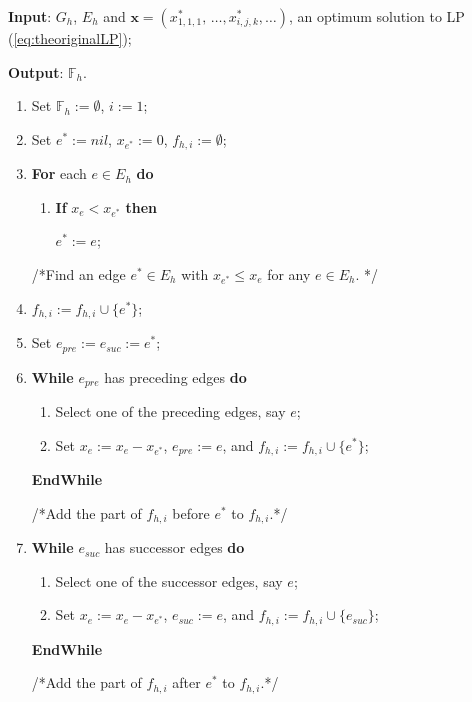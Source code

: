 \documentclass[11pt,english,onecolumn,draftcls]{IEEEtran}
\theoremstyle{plain}
\theoremstyle{plain}
\theoremstyle{plain}
\theoremstyle{plain}
\begin{document}
\begin{algorithm}
\textbf{Input}: $G_{h}$, $E_{h}$ and $\mathbf{x}=(x_{1,1,1}^{*},\,\dots,x_{i,j,k}^{*},\dots)$,
an optimum solution to LP (\ref{eq:theoriginalLP});

\textbf{Output}: $\mathbb{F}_{h}$.
\begin{enumerate}
\item Set $\mathbb{F}_{h}:=\emptyset$, $i:=1$;
\item Set $e^{*}:=nil$, $x{}_{e^{*}}:=0$, $f_{h,i}:=\emptyset$;
\item \textbf{For }each $e\in E_{h}$ \textbf{do}

\begin{enumerate}
\item \textbf{If} $x_{e}<x_{e^{*}}$ \textbf{then}


$e^{*}:=e$;

\end{enumerate}

/{*}Find an edge $e^{*}\in E_{h}$ with $x_{e^{*}}\leq x_{e}$ for
any $e\in E_{h}$. {*}/

\item $f_{h,i}:=f_{h,i}\cup\{e^{*}\}$;
\item Set $e_{pre}:=e_{suc}:=e^{*}$;
\item \textbf{While} $e_{pre}$ has preceding edges \textbf{do}

\begin{enumerate}
\item Select one of the preceding edges, say $e$;
\item Set $x_{e}:=x_{e}-x_{e^{*}}$, $e_{pre}:=e$, and $f_{h,i}:=f_{h,i}\cup\{e^{*}\}$;
\end{enumerate}

\textbf{EndWhile}


/{*}Add the part of $f_{h,i}$ before $e^{*}$ to $f_{h,i}$.{*}/

\item \textbf{While} $e_{suc}$ has successor edges \textbf{do}

\begin{enumerate}
\item Select one of the successor edges, say $e$;
\item Set $x_{e}:=x_{e}-x_{e^{*}}$, $e_{suc}:=e$, and $f_{h,i}:=f_{h,i}\cup\{e_{suc}\}$;
\end{enumerate}

\textbf{EndWhile}


/{*}Add the part of $f_{h,i}$ after $e^{*}$ to $f_{h,i}$.{*}/


\end{enumerate}
\end{algorithm}
\end{document}
